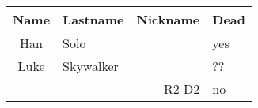 \documentclass[12pt]{article}
\begin{document}
  \renewcommand{\tabcolsep}{0.5cm}        %
  \renewcommand{\doublerulesep}{0.1cm}    %
  \renewcommand{\arraystretch}{1.0}       %
  \setlength{\arrayrulewidth}{1.0pt}      %


	\begin{tabular}{|c|l||r |p{3cm}|}       %
	  \hline
	  Name & Lastname & Nickname & Dead \\
	  \hline
	  \hline
	  Han & Solo & & yes \\
	  \hline
	  Luke & Skywalker & & ?? \\
	  \hline
	  & & R2-D2  & no \\
	  \hline
	
	\end{tabular}
\end{document}
